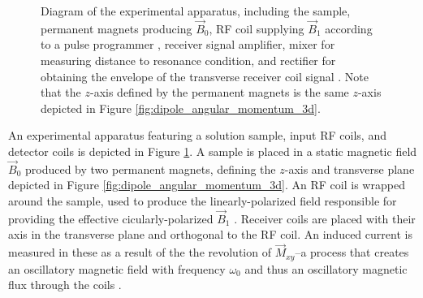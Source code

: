 \documentclass[11pt]{article}
\begin{document}
\begin{figure}[H]
{
  }
  \caption{Diagram of the experimental apparatus, including the
    sample, permanent magnets producing $\vec B_0$, RF coil supplying
    $\vec B_1$ according to a pulse programmer \cite{young, knight},
    receiver signal
    amplifier, mixer for measuring distance to resonance condition,
    and rectifier for obtaining the envelope of the transverse receiver
    coil signal \cite{boylestad}. Note that the $z$-axis defined by
    the permanent
    magnets is the same $z$-axis depicted in Figure
  \ref{fig:dipole_angular_momentum_3d}.}
  \label{fig:system_diagram}
\end{figure}

An experimental apparatus featuring a solution sample, input RF
coils, and detector coils is depicted in Figure
\ref{fig:system_diagram}. A sample is placed
in a static magnetic field $\vec B_0$ produced by two permanent
magnets, defining the $z$-axis and transverse plane depicted in Figure
\ref{fig:dipole_angular_momentum_3d}. An RF coil is wrapped around
the sample, used to produce the linearly-polarized field responsible
for providing the effective cicularly-polarized $\vec B_1$
\cite{young, knight}. Receiver coils
are placed with their axis in the transverse plane and orthogonal to the
RF coil. An induced current is measured in these as a result of the
the revolution of $\vec M_{xy}$--a process that creates an
oscillatory magnetic field with frequency $\omega_0$ and thus an
oscillatory magnetic flux through the coils \cite{young, knight}.
\end{document}
